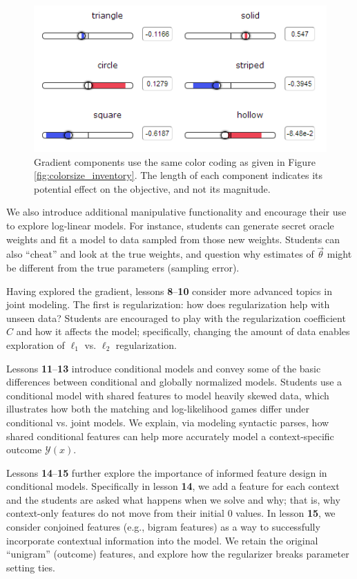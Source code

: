 \documentclass[11pt,letterpaper]{article}
\begin{document}
\begin{figure}[t]
\centering
\small
\includegraphics[scale=.65]{images/gradient-lesson7.PNG}
\caption{Gradient components use the same color coding as given in Figure \ref{fig:colorsize_inventory}. The length of each component indicates its potential effect on the objective, and not its magnitude.}
\label{fig:gradients}
\end{figure}

We also introduce additional manipulative functionality and encourage their use to 
explore log-linear models. For instance, students can generate secret oracle weights and 
fit a model to data sampled from those new weights. Students can also ``cheat'' and look at the true 
weights,  and question why estimates of $\vec{\theta}$ might be different from the true parameters 
(sampling error).

Having explored the gradient, lessons \textbf{8}--\textbf{10} consider more advanced topics in joint 
modeling. The first is regularization: how does regularization help with unseen data? Students are encouraged 
to play with the regularization coefficient $C$ and how it affects the model; specifically, changing the amount 
of data enables exploration of $\ell_1$ vs. $\ell_2$ regularization.

Lessons \textbf{11}--\textbf{13} introduce conditional models and convey some of the basic differences between 
conditional and globally normalized models. Students use a conditional model with shared features to model 
heavily skewed data, which illustrates how both the matching and log-likelihood games differ under conditional vs. 
joint models. We explain, via modeling syntactic parses, how shared conditional features can help more accurately 
model a context-specific outcome $\mathcal{Y}(x)$.

Lessons \textbf{14}--\textbf{15} further explore the importance of informed feature design in conditional models. 
Specifically in lesson \textbf{14}, we add a feature for each context and the students are asked what happens 
when we solve and why; that is, why context-only features do not move from their initial 0 values. 
In lesson \textbf{15}, we consider conjoined features (e.g., bigram features) as a way to successfully incorporate 
contextual information into the model. We retain the original ``unigram'' (outcome) features, and explore
how the regularizer breaks parameter setting ties.
\end{document}
